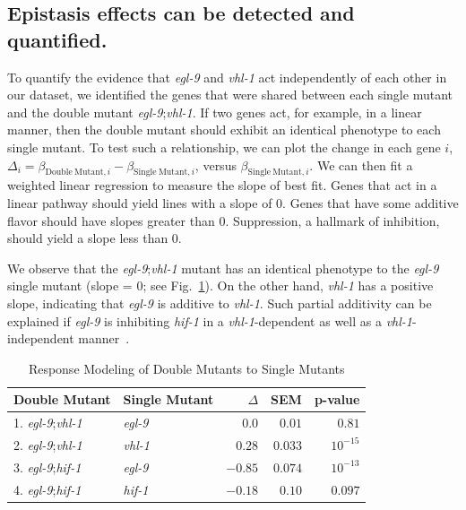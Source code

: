 \documentclass[9pt,twocolumn,twoside]{pnas-new}
\newcommand{\egl}{\emph{egl-9}}
\newcommand{\vhl}{\emph{vhl-1}}
\newcommand{\hif}{\emph{hif-1}}
\begin{document}
\subsection{Epistasis effects can be detected and quantified.}
\label{sub:Epistasis}
To quantify the evidence that \egl{} and \vhl{} act independently of each other in our dataset, we identified the genes that were shared between each single mutant and the double mutant \egl{};\vhl{}. If two genes act, for example, in a linear manner, then the double mutant should exhibit an identical phenotype to each single mutant. To test such a relationship, we can plot the change in each gene $i$, $\Delta_i = \beta_{\mathrm{Double~Mutant}, i} - \beta_{\mathrm{Single~Mutant}, i}$, versus $\beta_{\mathrm{Single~Mutant}, i}$. We can then fit a weighted linear regression to measure the slope of best fit. Genes that act in a linear pathway should yield lines with a slope of 0. Genes that have some additive flavor should have slopes greater than 0. Suppression, a hallmark of inhibition, should yield a slope less than 0.

We observe that the \egl{};\vhl{} mutant has an identical phenotype to the \egl{} single mutant (slope = 0; see Fig.~\ref{tab:double_mutant_comparison}). On the other hand, \vhl{} has a positive slope, indicating that \egl{} is additive to \vhl{}. Such partial additivity can be explained if \egl{} is inhibiting \hif{} in a \vhl{}-dependent as well as a \vhl{}-independent manner~\cite{Shao2009}.
\begin{table}%
\centering
\caption{Response Modeling of Double Mutants to Single Mutants}
\begin{tabular}{llrrr}
Double Mutant & Single Mutant & $\Delta$ & SEM & p-value\\
\midrule
1. \egl{};\vhl{} & \egl{} & $0.0$ & $0.01$ & $0.81$\\
2. \egl{};\vhl{} & \vhl{} & $0.28$ & $0.033$ & $10^{-15}$\\
3. \egl{};\hif{} & \egl{} & $-0.85$ & $0.074$ & $10^{-13}$\\
4. \egl{};\hif{} & \hif{} & $-0.18$ & $0.10$ & $0.097$\\
\bottomrule
\end{tabular}

\label{tab:double_mutant_comparison}
\end{table}
\end{document}
